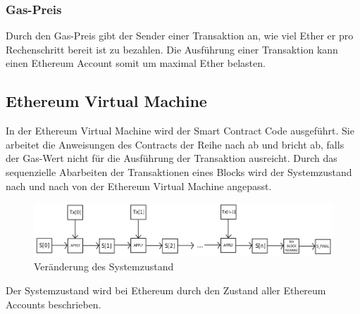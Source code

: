 \subsubsection{Gas-Preis}
Durch den Gas-Preis gibt der Sender einer Transaktion an, wie viel Ether er pro Rechenschritt bereit ist zu bezahlen. Die Ausführung einer Transaktion kann einen Ethereum Account somit um maximal  Ether belasten.

\subsection{Ethereum Virtual Machine}\label{eth_evm} 
In der Ethereum Virtual Machine wird der Smart Contract Code ausgeführt. Sie arbeitet die Anweisungen des Contracts der Reihe nach ab und bricht ab, falls der Gas-Wert nicht für die Ausführung der Transaktion ausreicht. Durch das sequenzielle Abarbeiten der Transaktionen eines Blocks wird der Systemzustand nach und nach von der Ethereum Virtual Machine angepasst.
\begin{figure}[H]
\centering
\includegraphics[width=1\linewidth]{Figures/eth/ETH_txn_statetransformation}
\decoRule
\caption{Veränderung des Systemzustand}
\label{fig:ETH_txn_statetransformation}
\end{figure}
Der Systemzustand wird bei Ethereum durch den Zustand aller Ethereum Accounts beschrieben. 

